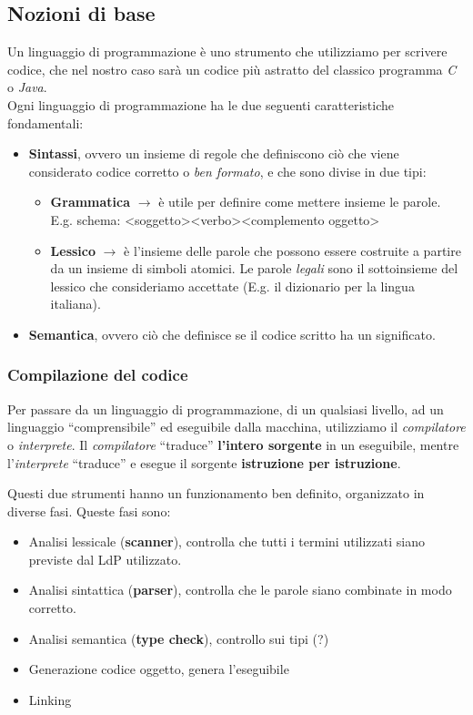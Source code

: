 \documentclass{article}
\begin{document}
\subsection{Nozioni di base}
Un linguaggio di programmazione è uno strumento che utilizziamo per scrivere codice, che nel nostro caso sarà un codice più astratto del classico programma \emph{C} o \emph{Java}.\\
Ogni linguaggio di programmazione ha le due seguenti caratteristiche fondamentali:
\begin{itemize}
    \item \textbf{Sintassi}, ovvero un insieme di regole che definiscono ciò che viene considerato codice corretto o \emph{ben formato}, e che sono divise in due tipi:
          \begin{itemize}
              \item \textbf{Grammatica} \(\rightarrow\) è utile per definire come mettere insieme le parole.\\
                    E.g. schema: \textless soggetto\textgreater\textless verbo\textgreater\textless complemento oggetto\textgreater
              \item \textbf{Lessico} \(\rightarrow\) è l'insieme delle parole che possono essere costruite a partire da un insieme di simboli atomici. Le parole \emph{legali} sono il sottoinsieme del lessico che consideriamo accettate (E.g. il dizionario per la lingua italiana).
          \end{itemize}
    \item \textbf{Semantica}, ovvero ciò che definisce se il codice scritto ha un significato.
\end{itemize}

\subsubsection{Compilazione del codice}
Per passare da un linguaggio di programmazione, di un qualsiasi livello, ad un linguaggio ``comprensibile'' ed eseguibile dalla macchina, utilizziamo il \emph{compilatore} o \emph{interprete}. Il \emph{compilatore} ``traduce'' \textbf{l'intero sorgente} in un eseguibile, mentre l'\emph{interprete} ``traduce'' e esegue il sorgente \textbf{istruzione per istruzione}.

Questi due strumenti hanno un funzionamento ben definito, organizzato in diverse fasi. Queste fasi sono:
\begin{itemize}
    \item Analisi lessicale (\textbf{scanner}), controlla che tutti i termini utilizzati siano previste dal LdP utilizzato.
    \item Analisi sintattica (\textbf{parser}), controlla che le parole siano combinate in modo corretto.
    \item Analisi semantica (\textbf{type check}), controllo sui tipi (?)
    \item Generazione codice oggetto, genera l'eseguibile
    \item Linking
\end{itemize}
\end{document}
